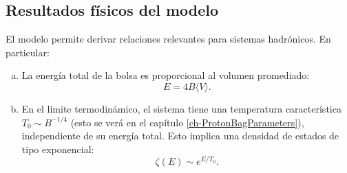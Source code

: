 \subsection*{Resultados físicos del modelo}

El modelo permite derivar relaciones relevantes para sistemas hadrónicos. En particular:

\begin{enumerate}[a)]
    \item La energía total de la bolsa es proporcional al volumen promediado:  
    \[
    E = 4B \langle V \rangle.
    \]
    
    \item En el límite termodinámico, el sistema tiene una temperatura característica \( T_0 \sim B^{-1/4} \) (esto se verá en el capítulo \ref{ch-ProtonBagParameters}), independiente de su energía total. Esto implica una densidad de estados de tipo exponencial:
    \[
    \zeta(E) \sim e^{E/T_0}.
    \]
\end{enumerate}